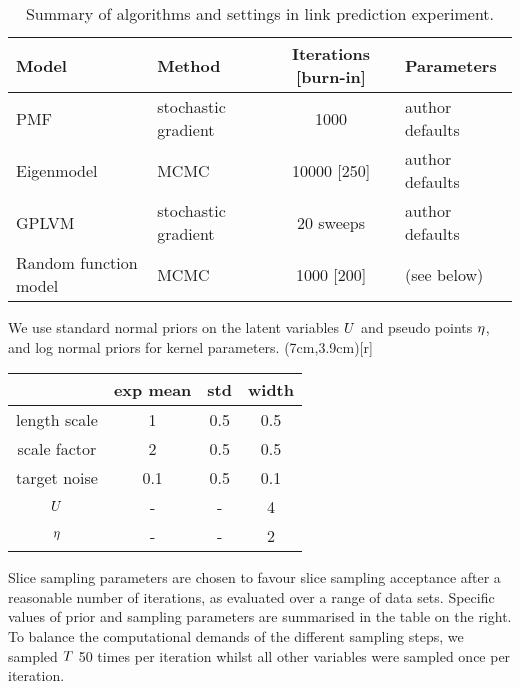 \begin{table}
\begin{center}
  \begin{tabular}{l  l  c  l }
    Model & Method & Iterations [burn-in] & Parameters\\
    \midrule
    PMF & stochastic gradient & 1000 & author defaults
    \\
    Eigenmodel & MCMC & 10000 [250] & author defaults
    \\
    GPLVM & stochastic gradient  & 20 sweeps & author defaults
    \\
    Random function model & MCMC & 1000 [200] & (see below)
  \end{tabular}
\end{center}
  \caption[Summary of algorithms and settings in link prediction experiment.]{Summary of algorithms and settings in link prediction experiment.}
  \label{table:networks:algorithms}
\end{table}

We use standard normal priors on the latent variables $U$ and pseudo points $\eta$, and log normal priors for kernel parameters.
\vspace{-0.18cm}
\parpic(7cm,3.9cm)[r]{
\begin{minipage}[h]{8cm}
\begin{center}
  \begin{tabular}{c | c c c}
    {} & exp mean & std & width \\
    \midrule
    length scale & 1 & 0.5 & 0.5 \\
    scale factor & 2 & 0.5 & 0.5 \\
    target noise & 0.1 & 0.5 & 0.1 \\
    $U$ & - & - & 4 \\
    $\eta$ & - & - & 2
  \end{tabular}
\end{center}
\end{minipage}}
Slice sampling parameters are chosen to favour slice sampling acceptance after a reasonable number of iterations, as evaluated over a range of data sets.
Specific values of prior and sampling parameters are summarised in the table on the right.
To balance the computational demands of the different sampling steps, we sampled $T$ 50 times per iteration whilst all other variables were sampled once per iteration.

